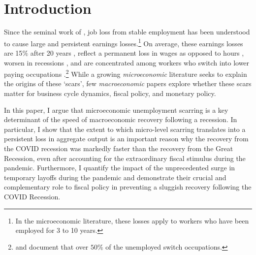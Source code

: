 
\section{Introduction}
Since the seminal work of \cite{Jacobson1993}, job loss from stable employment has been understood to cause large and persistent earnings losses.\footnote{In the microeconomic literature, these losses apply to workers who have been employed for 3 to 10 years.} On average, these earnings losses are 15$\%$ after 20 years \citep[e.g.][]{DavisVonWachter2011, Huckfeldt2022}, reflect a permanent loss in wages as opposed to hours \citep[e.g.][]{Moore2019, Lachowska2020,Huckfeldt2022}, worsen in recessions \citep{DavisVonWachter2011, Schmieder2023}, and are concentrated among workers who switch into lower paying occupations \citep{Huckfeldt2022}.\footnote{\cite{Huckfeldt2022} and \cite{Fujita2017} document that over $50\%$ of the unemployed switch occupations. } While a growing \textit{microeconomic} literature seeks to explain the origins of these `scars', few \textit{macroeconomic} papers explore whether these scars matter for business cycle dynamics, fiscal policy, and monetary policy. %


In this paper, I argue that microeconomic unemployment scarring is a key determinant of the speed of macroeconomic recovery following a recession. In particular, I show that the extent to which micro-level scarring translates into a persistent loss in aggregate output is an important reason why the recovery from the COVID recession was markedly faster than the recovery from the Great Recession, even after accounting for the extraordinary fiscal stimulus during the pandemic. Furthermore, I quantify the impact of the unprecedented surge in temporary layoffs during the pandemic and demonstrate their crucial and complementary role to fiscal policy in preventing a sluggish recovery following the COVID Recession.


